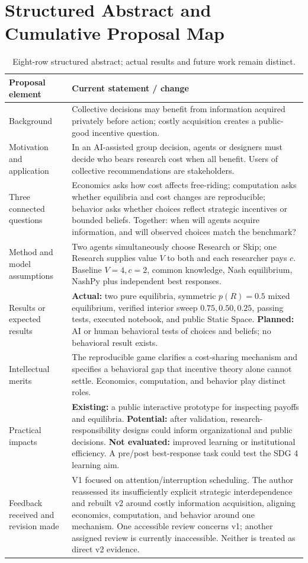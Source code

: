 \section{Structured Abstract and Cumulative Proposal Map}
\label{app:abstract}
\begin{table}[H]
\caption{Eight-row structured abstract; actual results and future work remain distinct.}
\begin{tabularx}{\textwidth}{@{}p{}Y@{}}
\toprule
Proposal element & Current statement / change\\\midrule
Background & Collective decisions may benefit from information acquired privately before action; costly acquisition creates a public-good incentive question.\\
Motivation and application & In an AI-assisted group decision, agents or designers must decide who bears research cost when all benefit. Users of collective recommendations are stakeholders.\\
Three connected questions & Economics asks how cost affects free-riding; computation asks whether equilibria and cost changes are reproducible; behavior asks whether choices reflect strategic incentives or bounded beliefs. Together: when will agents acquire information, and will observed choices match the benchmark?\\
Method and model assumptions & Two agents simultaneously choose Research or Skip; one Research supplies value \(V\) to both and each researcher pays \(c\). Baseline \(V=4,c=2\), common knowledge, Nash equilibrium, NashPy plus independent best responses.\\
Results or expected results & \textbf{Actual:} two pure equilibria, symmetric \(p(R)=0.5\) mixed equilibrium, verified interior sweep \(0.75,0.50,0.25\), passing tests, executed notebook, and public Static Space. \textbf{Planned:} AI or human behavioral tests of choices and beliefs; no behavioral result exists.\\
Intellectual merits & The reproducible game clarifies a cost-sharing mechanism and specifies a behavioral gap that incentive theory alone cannot settle. Economics, computation, and behavior play distinct roles.\\
Practical impacts & \textbf{Existing:} a public interactive prototype for inspecting payoffs and equilibria. \textbf{Potential:} after validation, research-responsibility designs could inform organizational and public decisions. \textbf{Not evaluated:} improved learning or institutional efficiency. A pre/post best-response task could test the SDG 4 learning aim.\\
Feedback received and revision made & V1 focused on attention/interruption scheduling. The author reassessed its insufficiently explicit strategic interdependence and rebuilt v2 around costly information acquisition, aligning economics, computation, and behavior around one mechanism. One accessible review concerns v1; another assigned review is currently inaccessible. Neither is treated as direct v2 evidence.\\
\bottomrule
\end{tabularx}
\end{table}

